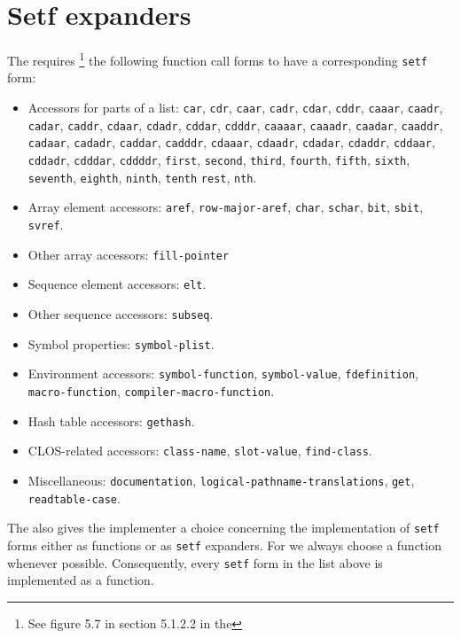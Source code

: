 \chapter{Setf expanders}

The \hs{} requires%
\footnote{See figure 5.7 in section 5.1.2.2 in the \hs{}} 
the following function call forms to have a corresponding
\texttt{setf} form:

\begin{itemize}
\item Accessors for parts of a list: \texttt{car}, \texttt{cdr},
  \texttt{caar}, \texttt{cadr}, \texttt{cdar}, \texttt{cddr},
  \texttt{caaar}, \texttt{caadr}, \texttt{cadar}, \texttt{caddr},
  \texttt{cdaar}, \texttt{cdadr}, \texttt{cddar}, \texttt{cdddr},
  \texttt{caaaar}, \texttt{caaadr}, \texttt{caadar}, \texttt{caaddr},
  \texttt{cadaar}, \texttt{cadadr}, \texttt{caddar}, \texttt{cadddr},
  \texttt{cdaaar}, \texttt{cdaadr}, \texttt{cdadar}, \texttt{cdaddr},
  \texttt{cddaar}, \texttt{cddadr}, \texttt{cdddar}, \texttt{cddddr},
  \texttt{first}, \texttt{second}, \texttt{third}, \texttt{fourth},
  \texttt{fifth}, \texttt{sixth}, \texttt{seventh}, \texttt{eighth},
  \texttt{ninth}, \texttt{tenth} \texttt{rest}, \texttt{nth}.
\item Array element accessors: \texttt{aref}, \texttt{row-major-aref},
  \texttt{char}, \texttt{schar}, \texttt{bit}, \texttt{sbit},
  \texttt{svref}.
\item Other array accessors: \texttt{fill-pointer}
\item Sequence element accessors: \texttt{elt}.
\item Other sequence accessors: \texttt{subseq}.
\item Symbol properties: \texttt{symbol-plist}.
\item Environment accessors: \texttt{symbol-function},
  \texttt{symbol-value}, \texttt{fdefinition},
  \texttt{macro-function}, \texttt{compiler-macro-function}.
\item Hash table accessors: \texttt{gethash}.
\item CLOS-related accessors: \texttt{class-name},
  \texttt{slot-value}, \texttt{find-class}.
\item Miscellaneous: \texttt{documentation},
  \texttt{logical-pathname-translations}, \texttt{get},
  \texttt{readtable-case}.
\end{itemize}

The \hs{} also gives the implementer a choice concerning the
implementation of \texttt{setf} forms either as functions or as
\texttt{setf} expanders.  For \sysname{} we always choose a function
whenever possible.  Consequently, every \texttt{setf} form in
the list above is implemented as a function.


